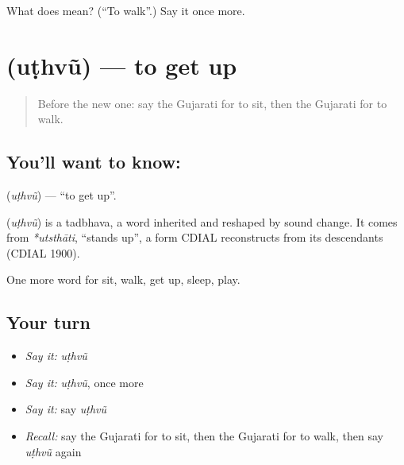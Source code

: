 \begin{tcolorbox}[breakable,colback=teal!4,colframe=teal!35!black,title={Before you move on}]
What does  mean? (\textquotedblleft{}To walk\textquotedblright{}.) Say it once more.
\end{tcolorbox}
\section[\texorpdfstring{\gu{ઉઠવું} (uṭhvũ)}{ઉઠવું (uṭhvũ)}]{ (uṭhvũ) — to get up}

\label{lesson:GU-C54-uthvu}



\begin{quote}
Before the new one: say the Gujarati for to sit, then the Gujarati for to walk.
\end{quote}

\subsection*{You'll want to know: }
\textbf{} (\emph{uṭhvũ}) — \textquotedblleft{}to get up\textquotedblright{}.

\begin{cousinweb}
\textbf{} (\emph{uṭhvũ}) is a tadbhava, a word inherited and reshaped by sound change. It comes from \emph{*utsthāti}, \textquotedblleft{}stands up\textquotedblright{}, a form CDIAL reconstructs from its descendants (CDIAL 1900).
\end{cousinweb}

\begin{grammarlens}[title={What you've built}]
One more word for sit, walk, get up, sleep, play.
\end{grammarlens}

\subsection*{Your turn}
\begin{itemize}
\raggedright
  \item \emph{Say it:} \emph{uṭhvũ}
  \item \emph{Say it:} \emph{uṭhvũ}, once more
  \item \emph{Say it:} say \emph{uṭhvũ}
  \item \emph{Recall:} say the Gujarati for to sit, then the Gujarati for to walk, then say \emph{uṭhvũ} again
\end{itemize}

